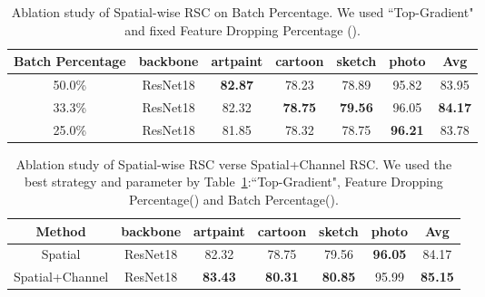 \documentclass[runningheads]{llncs}
\begin{document}
\begin{table}[!htb]
\footnotesize
\centering \fontsize{7}{8}\selectfont
\begin{tabular}{c| c| c| c| c| c|| c } \hline Batch Percentage & backbone & artpaint & cartoon & sketch & photo & Avg  \\ [0.5ex] \hline\hline 50.0\%& ResNet18  & \textbf{82.87} & 78.23 & 78.89 & 95.82& 83.95 \\ 33.3\%& ResNet18  & 82.32 & \textbf{78.75} & \textbf{79.56}& 96.05 & \textbf{84.17} \\ 25.0\%& ResNet18  & 81.85 & 78.32 & 78.75&  \textbf{96.21}& 83.78 \\ \hline 
\end{tabular}
\vspace{0.5em}
\caption{Ablation study of Spatial-wise RSC on Batch Percentage. We used ``Top-Gradient" and fixed Feature Dropping Percentage (). } \vspace{-1em}
\label{table:Ablation3} \end{table}

\begin{table}[!htb]
\footnotesize
\centering \fontsize{7}{8}\selectfont
\begin{tabular}{c| c| c| c| c| c|| c } \hline Method & backbone & artpaint & cartoon & sketch & photo & Avg  \\ [0.5ex] \hline\hline Spatial& ResNet18  & 82.32 & 78.75 & 79.56 & \textbf{96.05} & 84.17 \\ Spatial+Channel& ResNet18  & \textbf{83.43} & \textbf{80.31}  & \textbf{80.85} & 95.99 & \textbf{85.15} \\ \hline 
\end{tabular}
\vspace{0.5em}
\caption{Ablation study of Spatial-wise RSC verse Spatial+Channel RSC. We used the best strategy and parameter by Table~\ref{table:Ablation3}:``Top-Gradient", Feature Dropping Percentage() and Batch Percentage().} \vspace{-1em}
\label{table:Ablation4} \end{table}
\end{document}
